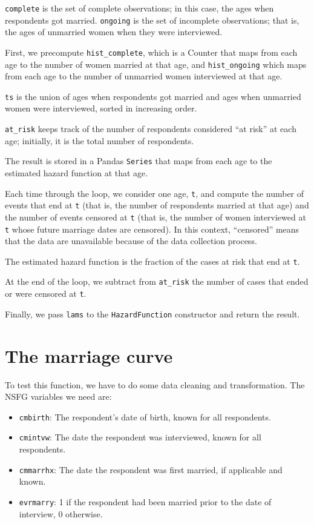 \documentclass[12pt]{book}
\theoremstyle{exercise}
\begin{document}
{\tt complete} is the set of complete observations; in this case,
the ages when respondents got married.  {\tt ongoing} is the set
of incomplete observations; that is, the ages of unmarried women
when they were interviewed.

First, we precompute \verb"hist_complete", which is a Counter
that maps from each age to the number of women married at that
age, and \verb"hist_ongoing" which maps from each age to the
number of unmarried women interviewed at that age.%
%

{\tt ts} is the union of ages when respondents got married
and ages when unmarried women were interviewed, sorted in
increasing order.

\verb"at_risk" keeps track of the number of respondents considered
``at risk'' at each age; initially, it is the total number of
respondents.

The result is stored in a Pandas {\tt Series} that maps from
each age to the estimated hazard function at that age.

Each time through the loop, we consider one age, {\tt t},
and compute the number of events that end at {\tt t} (that is,
the number of respondents married at that age) and the number
of events censored at {\tt t} (that is, the number of women
interviewed at {\tt t} whose future marriage dates are
censored).  In this context, ``censored'' means that the
data are unavailable because of the data collection process.

The estimated hazard function is the fraction of the cases
at risk that end at {\tt t}.

At the end of the loop, we subtract from \verb"at_risk" the
number of cases that ended or were censored at {\tt t}.

Finally, we pass {\tt lams} to the {\tt HazardFunction}
constructor and return the result.%


\section{The marriage curve}

To test this function, we have to do some data cleaning and
transformation.  The NSFG variables we need are:%

\begin{itemize}

\item {\tt cmbirth}: The respondent's date of birth, known for
all respondents.%

\item {\tt cmintvw}: The date the respondent was interviewed,
known for all respondents.

\item {\tt cmmarrhx}: The date the respondent was first married,
if applicable and known.

\item {\tt evrmarry}: 1 if the respondent had been
married prior to the date of interview, 0 otherwise.

\end{itemize}
\end{document}

